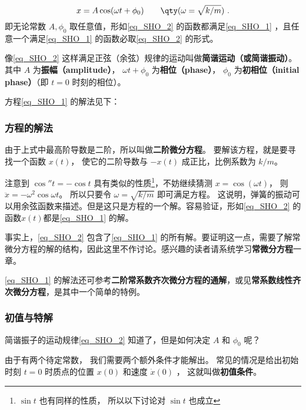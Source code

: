 \begin{equation}\label{eq_SHO_2}
x = A\cos(\omega t + \phi_0)  \qquad \qty(\omega  = \sqrt{k/m})~.
\end{equation}
即无论常数 $A, \phi_0$ 取任意值，形如\autoref{eq_SHO_2} 的函数都满足\autoref{eq_SHO_1} ，且任意一个满足\autoref{eq_SHO_1} 的函数必取\autoref{eq_SHO_2} 的形式。

像\autoref{eq_SHO_2} 这样满足正弦（余弦）规律的运动叫做\textbf{简谐运动（或简谐振动）}。其中 $A$ 为\textbf{振幅（amplitude）}， $\omega t + \phi_0$ 为\textbf{相位（phase）}， $\phi_0$ 为\textbf{初相位（initial phase）}（即 $t = 0$ 时刻的相位）。 


方程\autoref{eq_SHO_1} 的解法见下：



\subsubsection{方程的解法}

由于上式中最高阶导数是二阶，所以叫做\textbf{二阶微分方程}。 要解该方程，就是要寻找一个函数 $x(t)$， 使它的二阶导数与 $- x(t)$ 成正比，比例系数为 $k/m$。 

注意到 $\cos'' t =  - \cos t$ 具有类似的性质\footnote{$\sin t$ 也有同样的性质， 所以以下讨论对 $\sin t$ 也成立}，不妨继续猜测 $x = \cos(\omega t)$， 则 $\ddot x =  - {\omega ^2}\cos \omega t$。 所以只要令 $\omega = \sqrt{k/m}$ 即可满足方程。 这说明，弹簧的振动可以用余弦函数来描述。但是这只是方程的一个解。容易验证，形如\autoref{eq_SHO_2} 的函数$x(t)$都是\autoref{eq_SHO_1} 的解。

事实上，\autoref{eq_SHO_2}  包含了\autoref{eq_SHO_1}  的所有解。要证明这一点，需要了解常微分方程的解的结构，因此这里不作讨论。感兴趣的读者请系统学习\textbf{常微分方程}一章。

\autoref{eq_SHO_1} 的解法还可参考\textbf{二阶常系数齐次微分方程的通解}，或见\textbf{常系数线性齐次微分方程}，是其中一个简单的特例。


\subsubsection{初值与特解}


简谐振子的运动规律\autoref{eq_SHO_2} 知道了，但是如何决定 $A$ 和 $\phi_0$ 呢？ 

由于有两个待定常数， 我们需要两个额外条件才能解出。 常见的情况是给出初始时刻 $t = 0$ 时质点的位置 $x(0)$ 和速度 $\dot x(0)$ ， 这就叫做\textbf{初值条件}。


